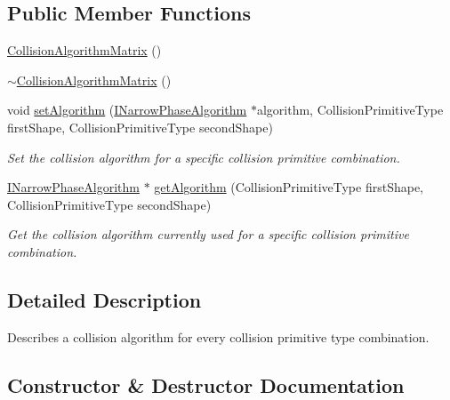 \subsection*{Public Member Functions}
\begin{DoxyCompactItemize}
\item 
\mbox{\hyperlink{classr3_1_1_collision_algorithm_matrix_a97bdad626057f600ae5ffca63eb174b8}{Collision\+Algorithm\+Matrix}} ()
\item 
\mbox{\hyperlink{classr3_1_1_collision_algorithm_matrix_adea2db794d9606ecf24745ad6ac912d8}{$\sim$\+Collision\+Algorithm\+Matrix}} ()
\item 
void \mbox{\hyperlink{classr3_1_1_collision_algorithm_matrix_a6ddf117fbce8a3216b4b4413ccade6d0}{set\+Algorithm}} (\mbox{\hyperlink{classr3_1_1_i_narrow_phase_algorithm}{I\+Narrow\+Phase\+Algorithm}} $\ast$algorithm, Collision\+Primitive\+Type first\+Shape, Collision\+Primitive\+Type second\+Shape)
\begin{DoxyCompactList}\small\item\em Set the collision algorithm for a specific collision primitive combination. \end{DoxyCompactList}\item 
\mbox{\hyperlink{classr3_1_1_i_narrow_phase_algorithm}{I\+Narrow\+Phase\+Algorithm}} $\ast$ \mbox{\hyperlink{classr3_1_1_collision_algorithm_matrix_ad40e0f125b95d6bcdb2e8a27c1397e68}{get\+Algorithm}} (Collision\+Primitive\+Type first\+Shape, Collision\+Primitive\+Type second\+Shape)
\begin{DoxyCompactList}\small\item\em Get the collision algorithm currently used for a specific collision primitive combination. \end{DoxyCompactList}\end{DoxyCompactItemize}


\subsection{Detailed Description}
Describes a collision algorithm for every collision primitive type combination. 

\subsection{Constructor \& Destructor Documentation}
\mbox{\label{classr3_1_1_collision_algorithm_matrix_a97bdad626057f600ae5ffca63eb174b8}} 
